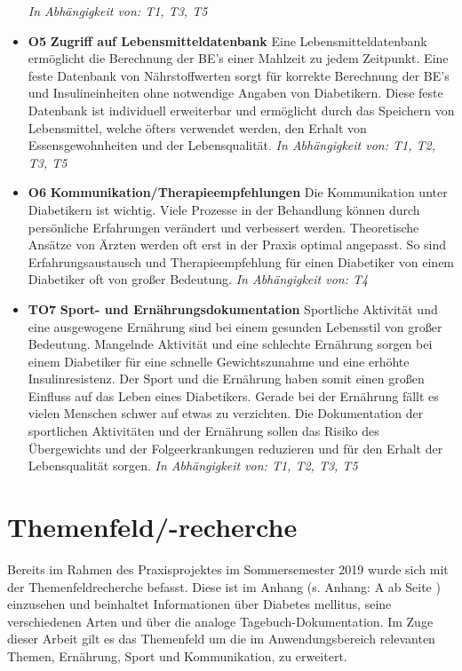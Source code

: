 \documentclass[a4paper,11pt]{article}%
\renewcommand{\\}{\vspace*{0.5\baselineskip} \newline}
\begin{document}
\begin{itemize}
	\emph{In Abhängigkeit von: T1, T3, T5} 
	\item \lbrack \textbf{O5}\rbrack  \textbf{ Zugriff auf Lebensmitteldatenbank} \\
	Eine Lebensmitteldatenbank ermöglicht die Berechnung der BE’s einer Mahlzeit zu jedem Zeitpunkt. Eine feste Datenbank von Nährstoffwerten sorgt für korrekte Berechnung der BE’s und Insulineinheiten ohne notwendige Angaben von Diabetikern. Diese feste Datenbank ist individuell erweiterbar und ermöglicht durch das Speichern von Lebensmittel, welche öfters verwendet werden, den Erhalt von Essensgewohnheiten und der Lebensqualität.\newline
	\emph{In Abhängigkeit von: T1, T2, T3, T5} 
	\item \lbrack \textbf{O6}\rbrack  \textbf{ Kommunikation/Therapieempfehlungen} \\
	Die Kommunikation unter Diabetikern ist wichtig. Viele Prozesse in der Behandlung können durch persönliche Erfahrungen verändert und verbessert werden. Theoretische Ansätze von Ärzten werden oft erst in der Praxis optimal angepasst. So sind Erfahrungsaustausch und Therapieempfehlung für einen Diabetiker von einem Diabetiker oft von großer Bedeutung. \newline
	\emph{In Abhängigkeit von: T4} 
	\item \lbrack \textbf{TO7}\rbrack  \textbf{ Sport- und Ernährungsdokumentation} \\
	Sportliche Aktivität und eine ausgewogene Ernährung sind bei einem gesunden Lebensstil von großer Bedeutung. Mangelnde Aktivität und eine schlechte Ernährung sorgen bei einem Diabetiker für eine schnelle Gewichtszunahme und eine erhöhte Insulinresistenz. Der Sport und die Ernährung haben somit einen großen Einfluss auf das Leben eines Diabetikers. Gerade bei der Ernährung fällt es vielen Menschen schwer auf etwas zu verzichten. Die Dokumentation der sportlichen Aktivitäten und der Ernährung sollen das Risiko des Übergewichts und der Folgeerkrankungen reduzieren und für den Erhalt der Lebensqualität sorgen.\newline
	\emph{In Abhängigkeit von: T1, T2, T3, T5} 
\end{itemize}
\newpage
\section{Themenfeld/-recherche}
	Bereits im Rahmen des Praxisprojektes im Sommersemester 2019 wurde sich mit der Themenfeldrecherche befasst. Diese ist im Anhang (s. Anhang: A  ab Seite \pageref{section:Themenfeld}) einzusehen und beinhaltet Informationen über Diabetes mellitus, seine verschiedenen Arten und über die analoge Tagebuch-Dokumentation. Im Zuge dieser Arbeit gilt es das Themenfeld um die im Anwendungsbereich relevanten Themen, Ernährung, Sport und Kommunikation, zu erweitert.
\end{document}
